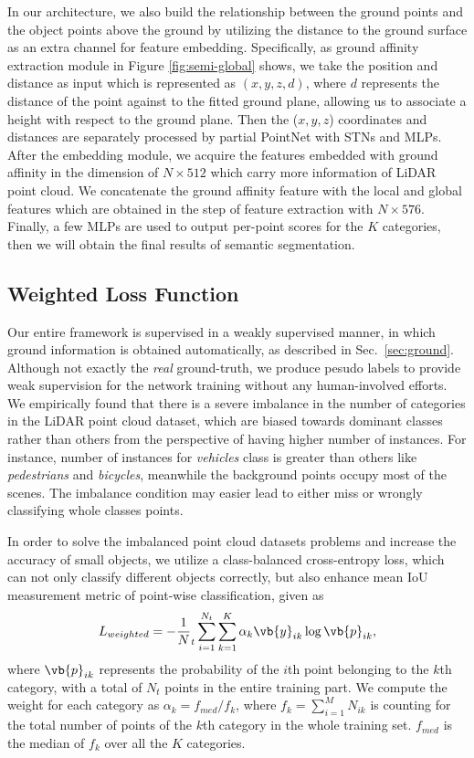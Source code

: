 \documentclass{sip}%
\begin{document}
In our architecture, we also build the relationship between the ground points and the object points above the ground by utilizing the distance to the ground surface as an extra channel for feature embedding. Specifically, as ground affinity extraction module in Figure \ref{fig:semi-global} shows, we take the position and distance as input which is represented as $(x,y,z,d)$, where $d$ represents the distance of the point against to the fitted ground plane, allowing us to associate a height with respect to the ground plane. 
Then the (${x, y, z}$) coordinates and distances are separately processed by partial PointNet with STNs and MLPs. 
After the embedding module, we acquire the features embedded with ground affinity in the dimension of $N\times512$ which carry more information of LiDAR point cloud. 
We concatenate the ground affinity feature with the local and global features which are obtained in the step of feature extraction with $N \times 576$. 
Finally, a few MLPs are used to output per-point scores for the $K$ categories, then we will obtain the final results of semantic segmentation.

\subsection{Weighted Loss Function}\label{sec:loss}
Our entire framework is supervised in a weakly supervised manner, in which ground information is obtained automatically, as described in Sec.~\ref{sec:ground}.
%
Although not exactly the \emph{real} ground-truth, we produce pesudo labels to provide weak supervision for the network training without any human-involved efforts.
%
We empirically found that there is a severe imbalance in the number of categories in the LiDAR point cloud dataset, which are biased towards dominant classes rather
than others from the perspective of having higher number of instances. 
For instance, number of instances for \emph{vehicles} class is greater than others like \emph{pedestrians} and \emph{bicycles}, meanwhile the background points occupy most of the scenes.
The imbalance condition may easier lead to either miss or wrongly classifying whole classes points.
%

In order to solve the imbalanced point cloud datasets problems and increase the accuracy of small objects, we utilize a class-balanced cross-entropy loss,
which can not only classify different objects correctly, but also enhance mean IoU measurement metric of point-wise classification, 
given as
%
\begin{equation}\label{eq:cbloss}
L_{weighted}=-\frac1N_t\sum_{i=1}^{N_t}\sum_{k=1}^{K}\alpha_k \vb{y}_{ik}\log \vb{p}_{ik} ,
\end{equation}
where $\vb{p}_{ik}$ represents the probability of the $i$th point belonging to the $k$th category, with a total of $N_t$ points in the entire training part.
We compute the weight for each category as $\alpha_k=f_{med}/f_k$, where $f_k=\sum^M_{i=1} N_{ik}$ is counting for the total number of points of the $k$th category in the whole training set.
$f_{med}$ is the median of $f_k$ over all the $K$ categories.  
\end{document}
